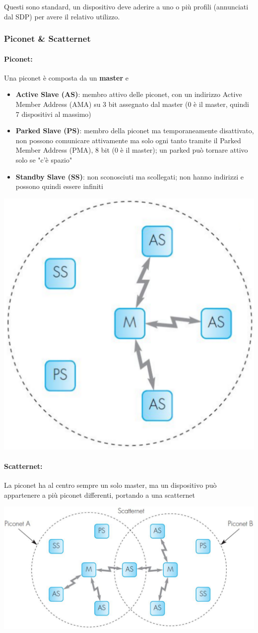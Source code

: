 Questi sono standard, un dispositivo deve aderire a uno o più profili (annunciati dal SDP) per avere il relativo utilizzo.

\subsubsection{Piconet \& Scatternet}

\paragraph{Piconet:} Una piconet è composta da un \textbf{master} e
\begin{itemize}
	\item \textbf{Active Slave (AS)}: membro attivo delle piconet, con un indirizzo Active Member Address (AMA) su 3 bit assegnato dal master (0 è il master, quindi 7 dispositivi al massimo)
	
    \item \textbf{Parked Slave (PS)}: membro della piconet ma temporaneamente disattivato, non possono comunicare attivamente ma solo ogni tanto tramite il Parked Member Address (PMA), 8 bit (0 è il master); un parked può tornare attivo solo se "c'è spazio"
	
    \item \textbf{Standby Slave (SS)}: non sconosciuti ma scollegati; non hanno indirizzi e possono quindi essere infiniti
\end{itemize}
\begin{center}
	\includegraphics[width=0.4\linewidth]{img/wpan/pico1}
\end{center}

\paragraph{Scatternet:} La piconet ha al centro sempre un solo master, ma un dispositivo può appartenere a più piconet differenti, portando a una scatternet
\begin{center}
	\includegraphics[width=0.8\linewidth]{img/wpan/scatter}
\end{center}

